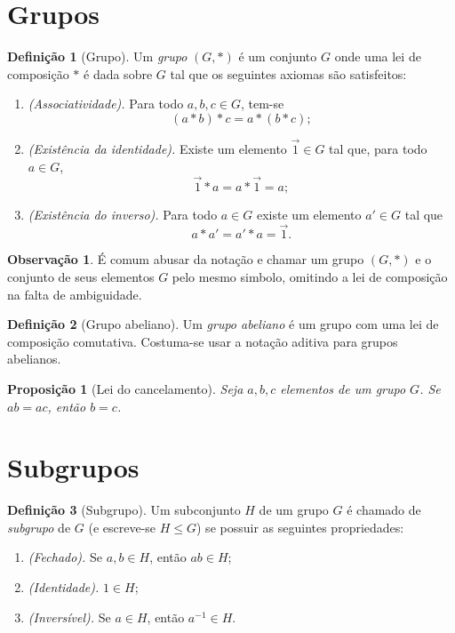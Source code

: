 \documentclass[a4paper,12pt]{report}
\theoremstyle{plain}
\newtheorem{proposicao}{Proposição}[section]
\theoremstyle{definition}
\newtheorem{definicao}{Definição}[section]
\newtheorem{observacao}{Observação}[section]
\begin{document}
\section{Grupos}

\begin{definicao}[Grupo]
	
	Um \emph{grupo} $(G,*)$ é um conjunto \(G\) onde uma lei de
	composição $*$ é dada sobre \(G\) tal que os seguintes axiomas são satisfeitos:
	
	\begin{enumerate}
		\item \emph{(Associatividade).} Para todo $a,b,c \in G$, tem-se $$(a*b)*c = a*(b*c);$$
		\item \emph{(Existência da identidade).} Existe um elemento $\vec{1}\in G$ tal que, para todo $a\in G$, $$\vec{1}*a = a*\vec{1} = a;$$
		\item \emph{(Existência do inverso).} Para todo $a\in G$ existe um elemento $a'\in G$ tal que $$a*a' = a'*a = \vec{1}.$$
	\end{enumerate}
\end{definicao}

\begin{observacao}
	É comum abusar da notação e chamar um grupo $(G,*)$ e o conjunto de	seus elementos $G$ pelo mesmo simbolo, omitindo a lei de composição na falta de ambiguidade.	
\end{observacao}

\begin{definicao}[Grupo abeliano]
	Um \emph{grupo abeliano} é um grupo com uma lei de
	composição comutativa. Costuma-se usar a notação aditiva para grupos
	abelianos.
\end{definicao}

\begin{proposicao}[Lei do cancelamento]
	Seja \(a,b,c\) elementos de um grupo \(G\). Se \(ab = ac\), então \(b = c\).
\end{proposicao} 

\section{Subgrupos}

\begin{definicao}[Subgrupo]
	Um subconjunto \(H\) de um grupo \(G\) é chamado de \emph{subgrupo} de \(G\) (e escreve-se $H \leq G$) se possuir as seguintes propriedades:
	
	\begin{enumerate}
		\item \emph{(Fechado).} Se \(a,b\in H\), então \(ab\in H\);
		\item \emph{(Identidade).} \(1\in H\);
		\item \emph{(Inversível).} Se \(a\in H\), então \(a^{-1}\in H\).
	\end{enumerate}
	
\end{definicao}
\end{document}
